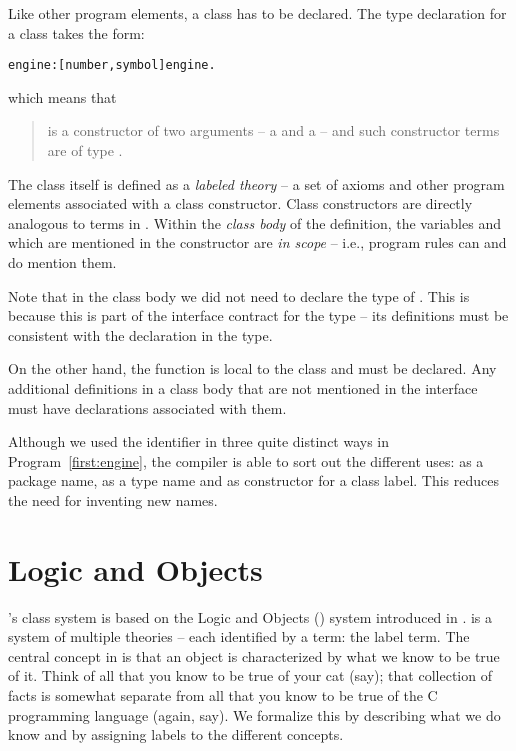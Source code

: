 Like other program elements, a class has to be declared. The type declaration for a class takes the form:
\begin{alltt}
engine:[number,symbol]\conarrow{}engine.
\end{alltt}
which means that
\begin{quote}
 is a constructor of two arguments -- a  and a  -- and such constructor terms are of type .
\end{quote}

The class itself is defined as a \emph{labeled theory} -- a set of axioms and other program elements associated with a class constructor. Class constructors are directly analogous to terms in \prolog. Within the \emph{class body} of the  definition, the variables  and  which are mentioned in the constructor are \emph{in scope} -- i.e., program rules can and do mention them.

Note that in the  class body we did not need to declare the type of . This is because this is part of the interface contract for the  type -- its definitions must be consistent with the declaration in the  type. 

On the other hand, the  function is local to the  class and must be declared. Any additional definitions in a class body that are not mentioned in the interface must have declarations associated with them.

\begin{aside}
Although we used the identifier  in three quite distinct ways in Program~\vref{first:engine}, the compiler is able to sort out the different uses: as a package name, as a type name and as constructor for a class label.  This reduces the need for inventing new names.
\end{aside}

\section{Logic and Objects}
\go's class system is based on the Logic and Objects (\LO) system introduced in \cite{fgm:92}. \LO is a system of multiple theories -- each identified by a term: the label term. The central concept in \LO is that an object is characterized by what we know to be true of it. Think of all that you know to be true of your cat (say); that collection of facts is somewhat separate from all that you know to be true of the C programming language (again, say). We formalize this by describing what we do know and by assigning labels to the different concepts.

